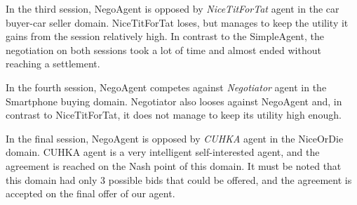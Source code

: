 \documentclass[html]{report}    %
\begin{document}
In the third session, NegoAgent is opposed by \textit{NiceTitForTat} agent in the car buyer-car seller domain. NiceTitForTat loses, but manages to keep the utility it gains from the session relatively high. In contrast to the SimpleAgent, the negotiation on both sessions took a lot of time and almost ended without reaching a settlement.

In the fourth session, NegoAgent competes against \textit{Negotiator} agent in the Smartphone buying domain. Negotiator also looses against NegoAgent and, in contrast to NiceTitForTat, it does not manage to keep its utility high enough.

In the final session, NegoAgent is opposed by \textit{CUHKA} agent in the NiceOrDie domain. CUHKA agent is a very intelligent self-interested agent, and the agreement is reached on the Nash point of this domain. It must be noted that this domain had only 3 possible bids that could be offered, and the agreement is accepted on the final offer of our agent.
\end{document}

